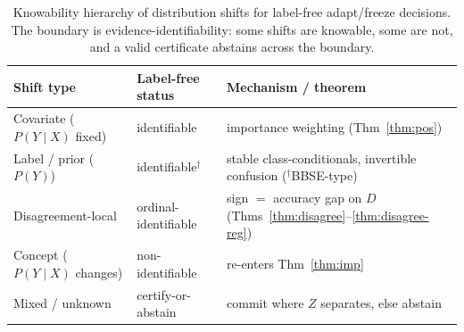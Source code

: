 \documentclass[11pt]{article}
\theoremstyle{plain}
\theoremstyle{definition}
\begin{document}
\begin{table}[h]\centering\small
\begin{tabular}{lll}
\toprule
Shift type & Label-free status & Mechanism / theorem \\
\midrule
Covariate ($P(Y\!\mid\!X)$ fixed) & identifiable & importance weighting (Thm~\ref{thm:pos}) \\
Label / prior ($P(Y)$) & identifiable$^\dagger$ & stable class-conditionals, invertible confusion ($^\dagger$BBSE-type) \\
Disagreement-local & ordinal-identifiable & sign $=$ accuracy gap on $D$ (Thms~\ref{thm:disagree}--\ref{thm:disagree-reg}) \\
Concept ($P(Y\!\mid\!X)$ changes) & non-identifiable & re-enters Thm~\ref{thm:imp} \\
Mixed / unknown & certify-or-abstain & commit where $Z$ separates, else abstain \\
\bottomrule
\end{tabular}
\caption{Knowability hierarchy of distribution shifts for label-free adapt/freeze
decisions. The boundary is evidence-identifiability: some shifts are knowable, some are
not, and a valid certificate abstains across the boundary.}
\label{tab:shift}
\end{table}
\end{document}
